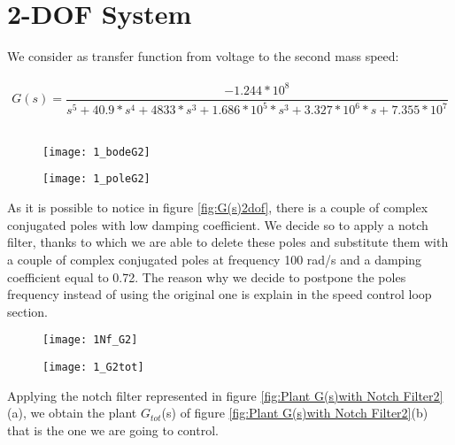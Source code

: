 \section{2-DOF System}
We consider as transfer function from voltage to the second mass speed:\\
\\
\[	
G(s)=
\frac{-1.244*10^{8}}{s^5+40.9*s^{4}+4833*s^{3}+1.686*10^{5}*s^{3}+3.327*10^{6}*s+7.355*10^{7}}
\]
\\



\begin{figure*}[h]
	\centering
	\begin{subfigure}{0.4\columnwidth}
		\texttt{[image: 1\_bodeG2]}
	\end{subfigure}
	\begin{subfigure}{0.4\columnwidth}
		\texttt{[image: 1\_poleG2]}
	\end{subfigure}
	\caption{G(s)}
	\label{fig:G(s)2dof}
\end{figure*}

As it is possible to notice in figure \ref{fig:G(s)2dof}, there is a couple of complex conjugated poles with low damping coefficient. We decide so to apply a notch filter, thanks to which we are able to delete these poles and substitute them with a couple of complex conjugated poles at frequency 100 rad/s and a damping coefficient equal to 0.72. The reason why we decide to postpone the poles frequency instead of using the original one is explain in the speed control loop section.


\begin{figure*}[h]
	\centering
	\begin{subfigure}{0.35\columnwidth}
		\texttt{[image: 1Nf\_G2]}
	\end{subfigure}
	\begin{subfigure}{0.35\columnwidth}
		\texttt{[image: 1\_G2tot]}
	\end{subfigure}
	\caption{Plant G(s) with Notch Filter Nf(s): $G_{tot}$(s)}
	\label{fig:Plant G(s)with Notch Filter2}
\end{figure*}


Applying the notch filter represented in figure \ref{fig:Plant G(s)with Notch Filter2}(a), we obtain the plant $G_{tot}$(s) of figure \ref{fig:Plant G(s)with Notch Filter2}(b) that is the one we are going to control.

